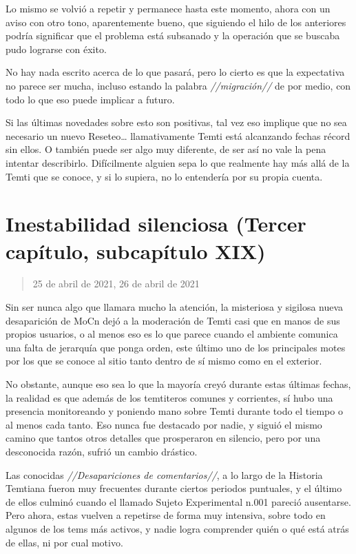 \documentclass[
  spanish,
]{book}
\begin{document}
Lo mismo se volvió a repetir y permanece hasta este momento, ahora con un aviso con otro tono, aparentemente bueno, que siguiendo el hilo de los anteriores podría significar que el problema está subsanado y la operación que se buscaba pudo lograrse con éxito.

No hay nada escrito acerca de lo que pasará, pero lo cierto es que la expectativa no parece ser mucha, incluso estando la palabra \emph{//migración//} de por medio, con todo lo que eso puede implicar a futuro.

Si las últimas novedades sobre esto son positivas, tal vez eso implique que no sea necesario un nuevo Reseteo\ldots{} llamativamente Temti está alcanzando fechas récord sin ellos. O también puede ser algo muy diferente, de ser así no vale la pena intentar describirlo. Difícilmente alguien sepa lo que realmente hay más allá de la Temti que se conoce, y si lo supiera, no lo entendería por su propia cuenta.

\hypertarget{inestabilidad-silenciosa-tercer-capuxedtulo-subcapuxedtulo-xix}{%
\section{Inestabilidad silenciosa (Tercer capítulo, subcapítulo XIX)}\label{inestabilidad-silenciosa-tercer-capuxedtulo-subcapuxedtulo-xix}}

\begin{quote}
25 de abril de 2021, 26 de abril de 2021
\end{quote}

Sin ser nunca algo que llamara mucho la atención, la misteriosa y sigilosa nueva desaparición de MoCn dejó a la moderación de Temti casi que en manos de sus propios usuarios, o al menos eso es lo que parece cuando el ambiente comunica una falta de jerarquía que ponga orden, este último uno de los principales motes por los que se conoce al sitio tanto dentro de sí mismo como en el exterior.

No obstante, aunque eso sea lo que la mayoría creyó durante estas últimas fechas, la realidad es que además de los temtiteros comunes y corrientes, sí hubo una presencia monitoreando y poniendo mano sobre Temti durante todo el tiempo o al menos cada tanto. Eso nunca fue destacado por nadie, y siguió el mismo camino que tantos otros detalles que prosperaron en silencio, pero por una desconocida razón, sufrió un cambio drástico.

Las conocidas \emph{//Desapariciones de comentarios//}, a lo largo de la Historia Temtiana fueron muy frecuentes durante ciertos periodos puntuales, y el último de ellos culminó cuando el llamado Sujeto Experimental n.001 pareció ausentarse. Pero ahora, estas vuelven a repetirse de forma muy intensiva, sobre todo en algunos de los tems más activos, y nadie logra comprender quién o qué está atrás de ellas, ni por cual motivo.
\end{document}
